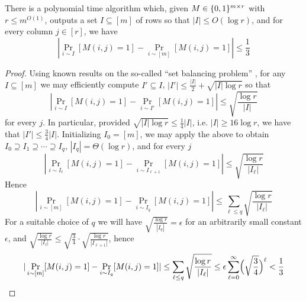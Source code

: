 \begin{lemma}
There is a polynomial time algorithm which, given $M \in \{0,1\}^{m \times r}$ with $r \leq m^{O(1)}$, outputs a set $I \subseteq [m]$ of rows so that $|I| \leq O(\log r)$, and for every column $j \in [r]$, we have 
\[
|\Pr_{i \sim I}[M(i,j) = 1] - \Pr_{i \sim [m]}[M(i,j) = 1]| \leq \frac{1}{3}
\]
\end{lemma}
\begin{proof}
Using known results on the so-called ``set balancing problem'' \cite{setbalancing}, for any $I \subseteq [m]$ we may efficiently compute $I'\subseteq I$, $|I'| \leq \frac{|I|}{2} + \sqrt{|I| \log r}$ so that 
\[
|\Pr_{i \sim I}[M(i,j) = 1] - \Pr_{i \sim I
'}[M(i,j) = 1]| \leq \sqrt{\frac{\log r}{|I|}}
\]
for every $j$. In particular, provided $\sqrt{|I|\log r} \leq \frac{1}{4}|I|$, i.e. $|I| \geq 16\log r$, we have that $|I'| \leq \frac{3}{4}|I|$.
Initializing $I_0 = [m]$, we may apply the above to obtain $I_0 \supseteq I_1 \supseteq \cdots \supseteq I_q$, $ |I_q| = \Theta(\log r)$, and for every $j$
\[
|\Pr_{i \sim I_{\ell}}[M(i,j) = 1] - \Pr_{i \sim I_{\ell+1}}[M(i,j) = 1]| \leq \sqrt{\frac{\log r}{|I_\ell|}}
\]
Hence
\[
|\Pr_{i \sim [m]}[M(i,j) = 1] - \Pr_{i \sim I_{q}}[M(i,j) = 1]| \leq \sum_{\ell \leq q} \sqrt{\frac{\log r}{|I_\ell|}}
\]
For a suitable choice of $q$ we will have $\sqrt{\frac{\log r}{|I_q|}} = \epsilon$ for an arbitrarily small constant $\epsilon$, and $\sqrt{\frac{\log r}{|I_{\ell}|}} \leq \sqrt{\frac{3}{4}} \cdot \sqrt{\frac{\log r}{|I_{\ell+1}|}}$, hence
\[
|\Pr_{i \sim [m]}[M(i,j) = 1] - \Pr_{i \sim I_{q}}[M(i,j) = 1]| \leq \sum_{\ell \leq q} \sqrt{\frac{\log r}{|I_\ell|}} \leq \epsilon \sum_{\ell =0}^{\infty} \Bigl(\sqrt{\frac{3}{4}}\Bigr)^\ell < \frac{1}{3}
\]
\end{proof}


